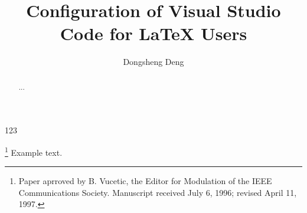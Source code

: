 \documentclass[journal]{IEEEtran}
\title{Configuration of Visual Studio Code for \LaTeX{} Users}
\author{Dongsheng Deng}
\begin{document}
\maketitle 
\begin{abstract}
    ...
\end{abstract}
\begin{IEEEkeywords}
    123
\end{IEEEkeywords}
\thanks{Paper aprroved by B. Vucetic, the Editor for Modulation of the IEEE Communications Society. Manuscript received July 6, 1996; revised April 11, 1997.}
Example text.
\end{document}
